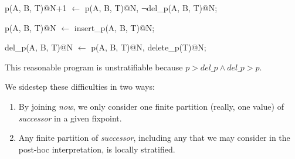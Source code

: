 \begin{Dedalus}
p(A, B, T)@N+1 \(\leftarrow\)
  p(A, B, T)@N,
  \(\lnot\)del\_p(A, B, T)@N;
  
  
p(A, B, T)@N \(\leftarrow\)
  insert\_p(A, B, T)@N;
  
del_p(A, B, T)@N \(\leftarrow\)
  p(A, B, T)@N,
  delete\_p(T)@N;
\end{Dedalus}

This reasonable program is unstratifiable because $p > del\_p \land del\_p > p$.  

We sidestep these difficulties in two ways:

\begin{enumerate}
\item By joining \emph{now}, we only consider one finite partition (really, one value) of \emph{successor} in a given fixpoint.
\item Any finite partition of \emph{successor}, including any that we may consider in the post-hoc interpretation, is locally stratified. 
\end{enumerate}
